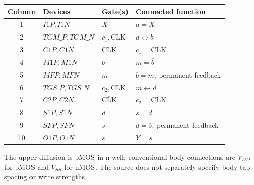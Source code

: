 \documentclass[10pt]{article}
\begin{document}
\begin{center}\begin{tabular}{clll}\toprule Column&Devices&Gate(s)&Connected function\\\midrule
1&$I1P,I1N$&$X$&$a=\bar X$\\
2&$TGM\_P,TGM\_N$&$c_1,\mathrm{CLK}$&$a\leftrightarrow b$\\
3&$C1P,C1N$&$\mathrm{CLK}$&$c_1=\overline{\mathrm{CLK}}$\\
4&$M1P,M1N$&$b$&$m=\bar b$\\
5&$MFP,MFN$&$m$&$b=\bar m$, permanent feedback\\
6&$TGS\_P,TGS\_N$&$c_2,\overline{\mathrm{CLK}}$&$m\leftrightarrow d$\\
7&$C2P,C2N$&$\overline{\mathrm{CLK}}$&$c_2=\mathrm{CLK}$\\
8&$S1P,S1N$&$d$&$s=\bar d$\\
9&$SFP,SFN$&$s$&$d=\bar s$, permanent feedback\\
10&$O1P,O1N$&$s$&$Y=\bar s$\\\bottomrule\end{tabular}\end{center}
The upper diffusion is pMOS in n-well; conventional body connections are $V_{DD}$ for pMOS and $V_{SS}$ for nMOS. The source does not separately specify body-tap spacing or write strengths.
\newpage
\end{document}
